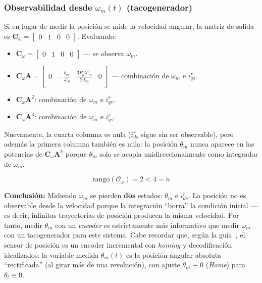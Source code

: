\documentclass[12pt, a4paper,journal, onecolumn, compsoc]{IEEEtran}
\begin{document}
\subsubsection{Observabilidad desde \texorpdfstring{$\omega_m(t)$}{omega_m(t)} (tacogenerador)}
Si en lugar de medir la posición se mide la velocidad angular, la matriz de salida es $\mathbf{C}_\omega = \begin{bmatrix} 0 & 1 & 0 & 0 \end{bmatrix}$. Evaluando:
\begin{itemize}
    \item $\mathbf{C}_\omega = \begin{bmatrix} 0 & 1 & 0 & 0 \end{bmatrix}$ --- se observa $\omega_m$.
    \item $\mathbf{C}_\omega\mathbf{A} = \begin{bmatrix} 0 & -\frac{b_{eq}}{J_{eq}} & \frac{3P_p\lambda'^r_m}{2J_{eq}} & 0 \end{bmatrix}$ --- combinación de $\omega_m$ e $i_{qs}^r$.
    \item $\mathbf{C}_\omega\mathbf{A}^2$: combinación de $\omega_m$ e $i_{qs}^r$.
    \item $\mathbf{C}_\omega\mathbf{A}^3$: combinación de $\omega_m$ e $i_{qs}^r$.
\end{itemize}

Nuevamente, la cuarta columna es nula ($i_{ds}^r$ sigue sin ser observable), pero además la primera columna también es nula: la posición $\theta_m$ nunca aparece en las potencias de $\mathbf{C}_\omega\mathbf{A}^k$ porque $\theta_m$ solo se acopla unidireccionalmente como integrador de $\omega_m$.

\begin{equation}
    \text{rango}(\mathcal{O}_\omega) = 2 < 4 = n
\end{equation}

\textbf{Conclusión:} Midiendo $\omega_m$ se pierden \textbf{dos} estados: $\theta_m$ e $i_{ds}^r$. La posición no es observable desde la velocidad porque la integración ``borra'' la condición inicial ---es decir, infinitas trayectorias de posición producen la misma velocidad. Por tanto, medir $\theta_m$ con un \textit{encoder} es estrictamente más informativo que medir $\omega_m$ con un tacogenerador para este sistema. Cabe recordar que, según la guía~\cite{guia_trabajo}, el sensor de posición es un encoder incremental con \textit{homing} y decodificación idealizados: la variable medida $\theta_m(t)$ es la posición angular absoluta ``rectificada'' (al girar más de una revolución), con ajuste $\theta_m \equiv 0$ (\textit{Home}) para $\theta_l \equiv 0$.
\end{document}
